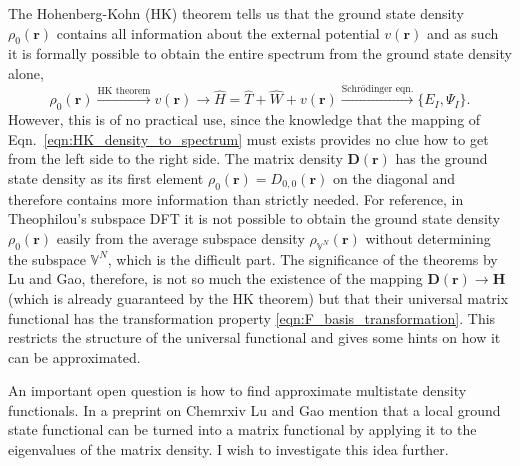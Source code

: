 \documentclass[journal=jacsat,manuscript=article]{achemso}
\newcommand\m[1]{\mathbf{#1}}
\renewcommand\vec[1]{\mathbf{#1}}
\begin{document}
The Hohenberg-Kohn (HK) theorem \cite{Hohenberg1964inhomogeneous} tells us that the ground state density $\rho_0(\vec{r})$
contains all information about the external potential $v(\vec{r})$
and as such it is formally possible to obtain the entire spectrum from the ground state density alone,
\begin{equation}
\rho_{0}(\vec{r}) \xrightarrow{\text{HK theorem}} v(\vec{r}) \longrightarrow \hat{H} = \hat{T} + \hat{W} + v(\vec{r}) \xrightarrow{\text{Schr\"{o}dinger eqn.}} \{ E_I, \Psi_I \}.
\label{eqn:HK_density_to_spectrum}
\end{equation}
However, this is of no practical use, since the knowledge that the mapping of Eqn.~\ref{eqn:HK_density_to_spectrum}
must exists provides no clue how to get from the left side to the right side.
 The matrix density $\m{D}(\vec{r})$ has the ground state density as its first element $\rho_{0}(\vec{r}) = D_{0,0}(\vec{r})$ on the diagonal
and therefore contains more information than strictly needed. For reference, in Theophilou's subspace DFT it is not possible to obtain the
ground state density $\rho_0(\vec{r})$ easily from the average subspace density $\rho_{\mathbb{V}^N}(\vec{r})$ without determining the subspace
$\mathbb{V}^N$, which is the difficult part.
The significance of the theorems by Lu and Gao, therefore, is not so much the existence of the mapping $\m{D}(\vec{r}) \to \m{H}$ (which is already
guaranteed by the HK theorem) but that their
universal matrix functional has the transformation property \ref{eqn:F_basis_transformation}.
This restricts the structure of the universal functional and gives some hints on how it can be approximated.

An important open question is how to find approximate multistate density functionals. 
In a preprint on Chemrxiv \cite{lu_gao_2021_chemrxiv} Lu and Gao mention that a local ground state functional
can be turned into a matrix functional by applying it to the eigenvalues of the matrix density.
I wish to investigate this idea further.
\end{document}
